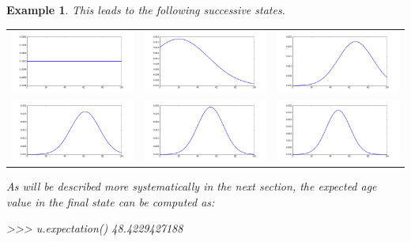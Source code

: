 \documentclass[leqno]{tufte-book} %
\newtheorem{example}[theorem]{Example}
\begin{document}
\begin{example}
This leads to the following successive states.
\begin{center}
\begin{tabular}{ccc}
\includegraphics[width=15em]{Pictures/tomb_state-0.png} 
&
\includegraphics[width=15em]{Pictures/tomb_state-1.png} 
&
\includegraphics[width=15em]{Pictures/tomb_state-2.png} 
\\
\includegraphics[width=15em]{Pictures/tomb_state-3.png} 
&
\includegraphics[width=15em]{Pictures/tomb_state-4.png} 
&
\includegraphics[width=15em]{Pictures/tomb_state-5.png} 
\end{tabular}
\end{center}

\noindent As will be described more systematically in the next section,
the expected age value in the final state can be computed as:
\begin{python}
>>> u.expectation()
48.4229427188
\end{python}
\end{example}
\end{document}
